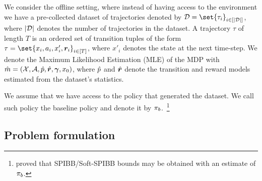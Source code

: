 We consider the offline setting, where instead of having access to the environment we have a pre-collected dataset 
of trajectories denoted by $\D = \set{\tau_i}_{i\in[|\D|]}$, where $|\mathcal{D}|$ denotes the number of trajectories in the dataset. A trajectory $\tau$ of length $T$ is an ordered set of transition tuples of the form $\tau = \set{x_i, a_i, x'_i, \bm{r}_i}_{i\in[T]}$, where $x'_i$ denotes the state at the next time-step.
We denote the Maximum Likelihood Estimation (MLE) of the MDP with $\hat{m} = (\mathcal{X}, \mathcal{A}, \hat{p}, \hat{\bm{r}}, \bm{\gamma}, x_0)$, where $\hat{p}$ and $\hat{\bm{r}}$ denote the transition and reward models estimated from the dataset's statistics.


\begin{assumption}
We assume that we have access to the policy that generated the dataset. We call such policy the baseline policy and denote it by $\pi_{b}$.~\footnote{\citet{simao2020} proved that SPIBB/Soft-SPIBB bounds may be obtained with an estimate of $\pi_{b}$.
}
\end{assumption}



\subsection{Problem formulation}
\label{sec:problem-formulation}

